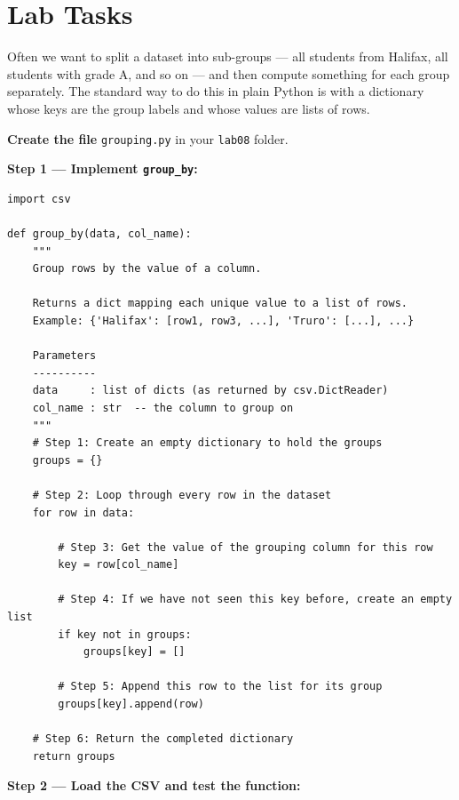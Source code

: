 \documentclass{cslab}
\begin{document}
\section{Lab Tasks}


Often we want to split a dataset into sub-groups --- all students from Halifax, all students with grade A, and so on --- and then compute something for each group separately. The standard way to do this in plain Python is with a dictionary whose keys are the group labels and whose values are lists of rows.

\textbf{Create the file} \texttt{grouping.py} in your \texttt{lab08} folder.

\textbf{Step 1 --- Implement \texttt{group\_by}:}

\begin{lstlisting}
import csv

def group_by(data, col_name):
    """
    Group rows by the value of a column.

    Returns a dict mapping each unique value to a list of rows.
    Example: {'Halifax': [row1, row3, ...], 'Truro': [...], ...}

    Parameters
    ----------
    data     : list of dicts (as returned by csv.DictReader)
    col_name : str  -- the column to group on
    """
    # Step 1: Create an empty dictionary to hold the groups
    groups = {}

    # Step 2: Loop through every row in the dataset
    for row in data:

        # Step 3: Get the value of the grouping column for this row
        key = row[col_name]

        # Step 4: If we have not seen this key before, create an empty list
        if key not in groups:
            groups[key] = []

        # Step 5: Append this row to the list for its group
        groups[key].append(row)

    # Step 6: Return the completed dictionary
    return groups
\end{lstlisting}

\textbf{Step 2 --- Load the CSV and test the function:}
\end{document}
